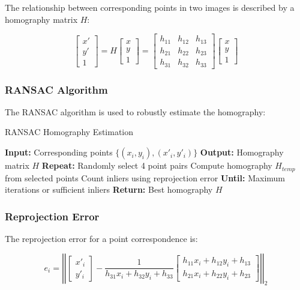 \documentclass[12pt,a4paper]{article}
\begin{document}
The relationship between corresponding points in two images is described by a homography matrix $H$:

\begin{equation}
\begin{bmatrix}
x' \\
y' \\
1
\end{bmatrix} = H \begin{bmatrix}
x \\
y \\
1
\end{bmatrix} = \begin{bmatrix}
h_{11} & h_{12} & h_{13} \\
h_{21} & h_{22} & h_{23} \\
h_{31} & h_{32} & h_{33}
\end{bmatrix} \begin{bmatrix}
x \\
y \\
1
\end{bmatrix}
\end{equation}

\subsubsection{RANSAC Algorithm}

The RANSAC algorithm is used to robustly estimate the homography:

\begin{algorithm}
\caption{RANSAC Homography Estimation}
\begin{algorithmic}[1]
\STATE \textbf{Input:} Corresponding points $\{(x_i, y_i), (x'_i, y'_i)\}$
\STATE \textbf{Output:} Homography matrix $H$
\STATE \textbf{Repeat:}
\STATE \quad Randomly select 4 point pairs
\STATE \quad Compute homography $H_{temp}$ from selected points
\STATE \quad Count inliers using reprojection error
\STATE \textbf{Until:} Maximum iterations or sufficient inliers
\STATE \textbf{Return:} Best homography $H$
\end{algorithmic}
\end{algorithm}

\subsubsection{Reprojection Error}

The reprojection error for a point correspondence is:

\begin{equation}
e_i = \left|\left| \begin{bmatrix}
x'_i \\
y'_i
\end{bmatrix} - \frac{1}{h_{31}x_i + h_{32}y_i + h_{33}} \begin{bmatrix}
h_{11}x_i + h_{12}y_i + h_{13} \\
h_{21}x_i + h_{22}y_i + h_{23}
\end{bmatrix} \right|\right|_2
\end{equation}
\end{document}
